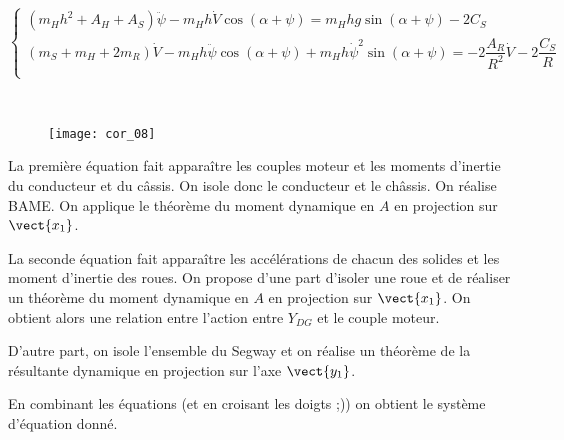 $$
\left\{
\begin{array}{l}
\left( m_H h^2 +A_H + A_S\right)\ddot{\psi} - m_H h \dot{V} \cos\left(\alpha+\psi\right) = m_H hg \sin\left(\alpha + \psi\right) - 2C_S \\
\left( m_S +m_H + 2m_R\right)\dot{V} - m_H h \ddot{\psi} \cos\left(\alpha+\psi\right) 
+ m_H h \dot{\psi}^2 \sin\left(\alpha+\psi\right) =  - 2\dfrac{A_R}{R^2}\dot{V} - 2\dfrac{C_S}{R}  \\
\end{array}
\right.
$$
\ifprof
\begin{corrige} ~\\

\begin{figure}[H]
\centering
\texttt{[image: cor\_08]}
\end{figure}

La première équation fait apparaître les couples moteur et les moments d'inertie du conducteur et du câssis. On isole donc le conducteur et le châssis. On réalise BAME.
On applique le théorème du moment dynamique en $A$ en projection sur $\vect{x_1}$.

La seconde équation fait apparaître les accélérations de chacun des solides et les moment d'inertie des roues. 
On propose d'une part d'isoler une  roue et de réaliser un théorème du moment dynamique en $A$ en projection sur $\vect{x_1}$. On obtient alors une relation entre l'action entre $Y_{DG}$ et le couple moteur.

D'autre part, on isole l'ensemble du Segway et on réalise un théorème de la résultante dynamique en projection sur l'axe  $\vect{y_1}$.

En combinant les équations (et en croisant les doigts ;)) on obtient le système d'équation donné. 

\end{corrige}
\else
\fi


